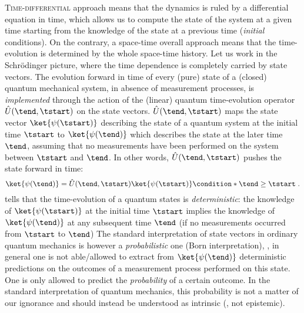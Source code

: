 
\lettrine{T}{ime-differential} approach means that the dynamics is ruled by a
differential equation in time, which allows us to compute the state of the
system at a given time starting from the knowledge of the state at a previous
time (\emph{initial} conditions).
On the contrary, a space-time overall approach means that 
the time-evolution is determined by the whole space-time history.
%
Let us work in the Schr\"odinger picture, where the time dependence is
completely carried by state vectors.  The evolution forward in time of every
(pure) state of a (closed) quantum mechanical system, in absence of measurement
processes, is \emph{implemented} through the action of the (linear) quantum
time-evolution operator $\hat{U}(\tend, \tstart)$ on the state vectors.
$\hat{U}(\tend, \tstart)$ maps the state vector $\ket{\psi(\tstart)}$ describing
the state of a quantum system at the initial time $\tstart$ to
$\ket{\psi(\tend)}$ which describes the state at the later time $\tend$,
assuming  that no measurements have been  performed on the system between
$\tstart$ and $\tend$.  In other words, $\hat{U}(\tend, \tstart)$ pushes the
state forward in time:
\begin{dmath}[label={intro:U}]
   \ket{\psi(\tend)} = \hat{U}(\tend, \tstart) \ket{\psi(\tstart)}
   \condition*{\tend\geq\tstart} \; .
\end{dmath}
 tells that the time-evolution of a quantum states is
\emph{deterministic}: the knowledge of $\ket{\psi(\tstart)}$ at the initial time
$\tstart$ implies the knowledge of $\ket{\psi(\tend)}$ at any subsequent time
$\tend$ (if no measurements occurred from $\tstart$ to $\tend$) The standard
interpretation of state vectors in ordinary quantum mechanics is however a
\emph{probabilistic} one (Born interpretation), \ie, in general one is not
able/allowed
to extract from $\ket{\psi(\tend)}$ deterministic predictions on the outcomes of
a measurement process performed on this state. One is only allowed to 
predict the \emph{probability} of a certain outcome. In the standard
interpretation of quantum
mechanics, this probability is not a matter of our ignorance and should instead
be understood as intrinsic
(\ie, not epistemic).

